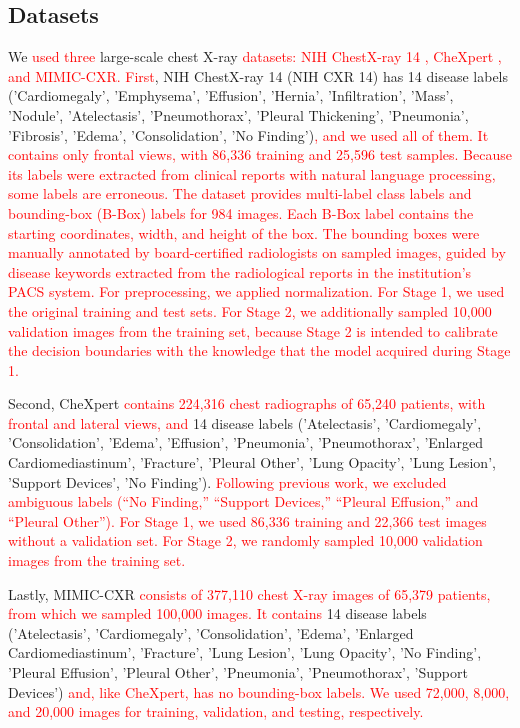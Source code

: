 \documentclass[preprint,7pt, a4paper]{elsarticle}
\begin{document}
\subsection{Datasets}
We \textcolor{red}{used three} large-scale chest X-ray \textcolor{red}{datasets}\textcolor{red}{: NIH ChestX-ray 14 \cite{82}, CheXpert \cite{48}, and MIMIC-CXR.} \textcolor{red}{First}, NIH ChestX-ray 14 (NIH CXR 14) has 14 disease labels ('Cardiomegaly', 'Emphysema', 'Effusion', 'Hernia', 'Infiltration', 'Mass', 'Nodule', 'Atelectasis', 'Pneumothorax', 'Pleural Thickening', 'Pneumonia', 'Fibrosis', 'Edema', 'Consolidation', 'No Finding')\textcolor{red}{, and we used all of them. It contains only frontal views, with 86,336 training and 25,596 test samples. Because its labels were extracted from clinical reports with natural language processing, some labels are erroneous. The dataset provides multi-label class labels and bounding-box (B-Box) labels for 984 images. Each B-Box label contains the starting coordinates, width, and height of the box. The bounding boxes were manually annotated by board-certified radiologists on sampled images, guided by disease keywords extracted from the radiological reports in the institution's PACS system. For preprocessing, we applied normalization. For Stage 1, we used the original training and test sets. For Stage 2, we additionally sampled 10,000 validation images from the training set, because Stage 2 is intended to calibrate the decision boundaries with the knowledge that the model acquired during Stage 1.}

Second, CheXpert \textcolor{red}{contains 224,316 chest radiographs of 65,240 patients, with frontal and lateral views, and} 14 disease labels ('Atelectasis', 'Cardiomegaly', 'Consolidation', 'Edema', 'Effusion', 'Pneumonia', 'Pneumothorax', 'Enlarged Cardiomediastinum', 'Fracture', 'Pleural Other', 'Lung Opacity', 'Lung Lesion', 'Support Devices', 'No Finding'). \textcolor{red}{Following previous work, we excluded ambiguous labels (``No Finding,'' ``Support Devices,'' ``Pleural Effusion,'' and ``Pleural Other''). For Stage 1, we used 86,336 training and 22,366 test images without a validation set. For Stage 2, we randomly sampled 10,000 validation images from the training set.}

Lastly, MIMIC-CXR \textcolor{red}{consists of 377,110 chest X-ray images of 65,379 patients, from which we sampled 100,000 images. It contains} 14 disease labels ('Atelectasis', 'Cardiomegaly', 'Consolidation', 'Edema', 'Enlarged Cardiomediastinum', 'Fracture', 'Lung Lesion', 'Lung Opacity', 'No Finding', 'Pleural Effusion', 'Pleural Other', 'Pneumonia', 'Pneumothorax', 'Support Devices') \textcolor{red}{and, like CheXpert, has no bounding-box labels. We used 72,000, 8,000, and 20,000 images for training, validation, and testing, respectively.}
\end{document}
